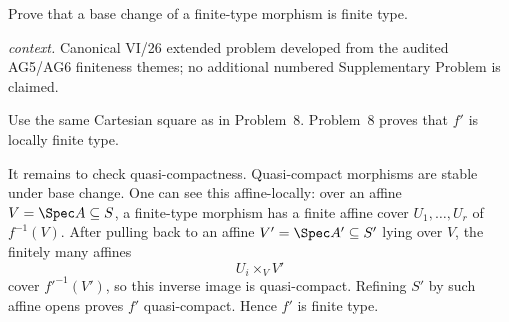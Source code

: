 \begin{problem}\label{prob:vi26-p09}
Prove that a base change of a finite-type morphism is finite type.
\par\smallskip\noindent\textit{context.} Canonical VI/26 extended problem developed from the audited AG5/AG6 finiteness themes; no additional numbered Supplementary Problem is claimed.
\end{problem}

\ifdefined\FullProblemDossiers
\begin{solution}
Use the same Cartesian square as in Problem~8.  Problem~8 proves that \(f'\) is locally finite type.

It remains to check quasi-compactness.  Quasi-compact morphisms are stable under base change.  One
can see this affine-locally: over an affine \(V=\Spec A\subseteq S\), a finite-type morphism has
a finite affine cover \(U_1,\ldots,U_r\) of \(f^{-1}(V)\).  After pulling back to an affine
\(V'=\Spec A'\subseteq S'\) lying over \(V\), the finitely many affines
\[
U_i\times_VV'
\]
cover \(f'^{-1}(V')\), so this inverse image is quasi-compact.  Refining \(S'\) by such affine opens
proves \(f'\) quasi-compact.  Hence \(f'\) is finite type.
\end{solution}
\fi
